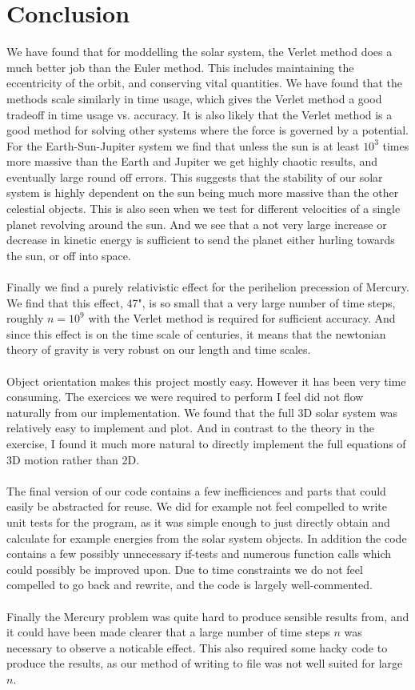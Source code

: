 \documentclass[%
 reprint,
 nobalance,
 amsmath,amssymb,
 aps,
]{revtex4-1}
\begin{document}
\section{Conclusion}
We have found that for moddelling the solar system, the Verlet method does a much better job than the Euler method.  This includes maintaining the eccentricity of the orbit, and conserving vital quantities. We have found that the methods scale similarly in time usage, which gives the Verlet method a good tradeoff in time usage vs. accuracy. It is also likely that the Verlet method is a good method for solving other systems where the force is governed by a potential.\\
For the Earth-Sun-Jupiter system we find that unless the sun is at least $10^3$ times more massive than the Earth and Jupiter we get highly chaotic results, and eventually large round off errors. This suggests that the stability of our solar system is highly dependent on the sun being much more massive than the other celestial objects. This is also seen when we test for different velocities of a single planet revolving around the sun. And we see that a not very large increase or decrease in kinetic energy is sufficient to send the planet either hurling towards the sun, or off into space. \\ \\
Finally we find a purely relativistic effect for the perihelion precession of Mercury. We find that this effect, 47", is so small that a very large number of time steps, roughly $n=10^9$ with the Verlet method is required for sufficient accuracy. And since this effect is on the time scale of centuries, it means that the newtonian theory of gravity is very robust on our length and time scales.\\\\
Object orientation makes this project mostly easy. However it has been very time consuming. The exercices we were required to perform I feel did not flow naturally from our implementation. We found that the full 3D solar system was relatively easy to implement and plot. And in contrast to the theory in the exercise, I found it much more natural to directly implement the full equations of 3D motion rather than 2D. \\ \\
The final version of our code contains a few inefficiences and parts that could easily be abstracted for reuse. We did for example not feel compelled to write unit tests for the program, as it was simple enough to just directly obtain and calculate for example energies from the solar system objects. In addition the code contains a few possibly unnecessary if-tests and numerous function calls which could possibly be improved upon. Due to time constraints we do not feel compelled to go back and rewrite, and the code is largely well-commented. \\ \\
Finally the Mercury problem was quite hard to produce sensible results from, and it could have been made clearer that a large number of time steps $n$ was necessary to observe a noticable effect. This also required some hacky code to produce the results, as our method of writing to file was not well suited for large $n$.
\end{document}
